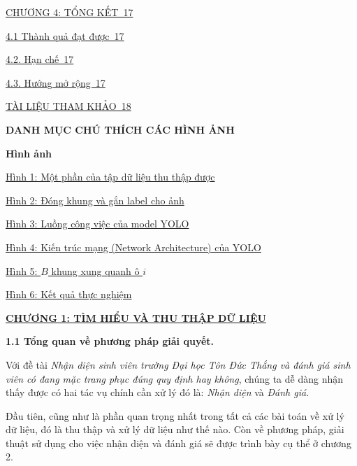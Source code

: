 \documentclass{report}
\begin{document}
\smallskip
\setlength{\parindent}{0.0cm}
\hyperlink{page.17}{CHƯƠNG 4: TỔNG KẾT\dotfill\ 17}

\setlength{\parindent}{0.5cm}
\hyperlink{page.17}{4.1 Thành quả đạt được\dotfill\ 17}

\hyperlink{page.17}{4.2. Hạn chế\dotfill\ 17}

\hyperlink{page.17}{4.3. Hướng mở rộng\dotfill\ 17}

\setlength{\parindent}{0cm}
\smallskip
\hyperlink{page.18}{TÀI LIỆU THAM KHẢO\dotfill\ 18}


\newpage
\changefontsizes{16pt}
\centerline{\textbf{DANH MỤC CHÚ THÍCH CÁC HÌNH ẢNH}}

\vspace{1cm}
\changefontsizes{14pt}
\setlength{\parindent}{0cm}
\bigskip
\textbf{Hình ảnh}

\smallskip
\setlength{\parindent}{1cm}
\changefontsizes{13pt}
\hyperlink{page.9}{Hình 1: Một phần của tập dữ liệu thu thập được}

\smallskip
\hyperlink{page.10}{Hình 2: Đóng khung và gắn label cho ảnh}

\smallskip
\hyperlink{page.12}{Hình 3: Luồng công việc của model YOLO}

\smallskip
\hyperlink{page.12}{Hình 4: Kiến trúc mạng (Network Architecture) của YOLO}

\smallskip
\hyperlink{page.13}{Hình 5: $B$ khung xung quanh ô $i$}


\smallskip
\hyperlink{page.15}{Hình 6: Kết quả thực nghiệm}


\newpage
\changefontsizes{16pt}
\centerline{\textbf{\hyperlink{page.7}{CHƯƠNG 1: TÌM HIỂU VÀ THU THẬP DỮ LIỆU}}}



\bigskip
\changefontsizes{14pt}
\setlength{\parindent}{0.0cm}
\textbf{1.1 Tổng quan về phương pháp giải quyết.}

\smallskip
\changefontsizes{13pt}
\setlength{\parindent}{1cm}
Với đề tài \textit{Nhận diện sinh viên trường Đại học Tôn Đức Thắng và đánh giá sinh viên có đang mặc trang phục đúng quy định hay không}, chúng ta dễ dàng nhận thấy được có hai tác vụ chính cần xử lý đó là: \textit{Nhận diện} và \textit{Đánh giá}.

Đầu tiên, cũng như là phần quan trọng nhất trong tất cả các bài toán về xử lý dữ liệu, đó là thu thập và xử lý dữ liệu như thế nào. Còn về phương pháp, giải thuật sử dụng cho việc nhận diện và đánh giá sẽ được trình bày cụ thể ở chương 2. 
\end{document}
